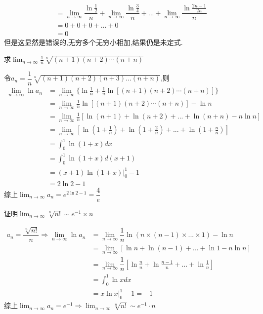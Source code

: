 \documentclass[8pt a4paper, oneside, UTF8]{ctexbook}
\begin{document}
\begin{sloppypar}
\begin{note}
\begin{align*}
            & = \lim_{n \to \infty}\dfrac{\ln \frac{1}{2}}{n}+\lim_{n \to \infty}\dfrac{\ln \frac{3}{4}}{n}+...+\lim_{n \to \infty}\dfrac{\ln \frac{2n-1}{2n}}{n}\\
            & = 0+0+0+...+0\\
            &=0
        \end{align*}
        但是这显然是错误的,无穷多个无穷小相加,结果仍是未定式.
    \end{note}
    \begin{problem}
        求$\lim_{n\to\infty}\frac{1}{n}\sqrt[n]{(n+1)(n+2)\cdots(n+n)}$
    \end{problem}
    \begin{solution}
        令$a_n=\dfrac{1}{n}\sqrt[n]{(n+1)(n+2)(n+3)...(n+n)}$,则
        \begin{align*}
            \lim_{n \to \infty}\ln a_n & = \lim_{n \to \infty} \{ \ln\frac{1}{n}+\frac{1}{n} \ln[(n+1)(n+2)\cdots(n+n)]\}\\
          & = \lim_{n\to \infty}\frac{1}{n} \ln[(n+1)(n+2)\cdots(n+n)]- \ln n\\
          & = \lim_{n \to \infty}\frac{1}{n}[\ln(n+1)+\ln(n+2)+...+\ln(n+n)-n\ln n]\\
          & = \lim_{n\to \infty}[\ln(1+\frac{1}{n})+\ln(1+\frac{2}{n})+...+\ln(1+\frac{n}{n})]\\
          & = \int_0^1 \ln(1+x)dx \\
          & = \int_0^1 \ln(1+x)d(x+1)\\
          & = (x+1)\ln(1+x)|_0^1 -1\\
          & = 2\ln2 -1
        \end{align*}
    综上$\lim_{n\to \infty}a_n=e^{2\ln2-1}=\dfrac{4}{e}$
    \end{solution}
    \begin{problem}
        证明$\lim_{n\to \infty}\sqrt[n]{n!}\sim e^{-1}\times n$
    \end{problem}
    \begin{solution}
        \begin{align*}
            a_n=\dfrac{\sqrt[n]{n!}}{n} \Rightarrow \lim_{n\to \infty}\ln a_n & =\lim_{n\to \infty}\dfrac{1}{n}\ln(n\times (n-1)\times ...\times 1)-\ln n    \\
            & =  \lim_{n \to \infty}[\ln n+\ln(n-1)+...+\ln 1-n\ln n]\\
            & = \lim_{n\to \infty}\dfrac{1}{n}[\ln\frac{n}{n}+\ln\frac{n-1}{n}+...+\ln \frac{1}{n}]\\
            & =\int _0 ^1 \ln x dx\\
            & = x \ln x|_0^1-1 = -1
        \end{align*}
    综上$\lim_{n \to \infty}a_n=e^{-1} \Rightarrow \lim_{n\to \infty}\sqrt[n]{n!}\sim e^{-1}\cdot n$
    \end{solution}

\end{sloppypar}
\end{document}
